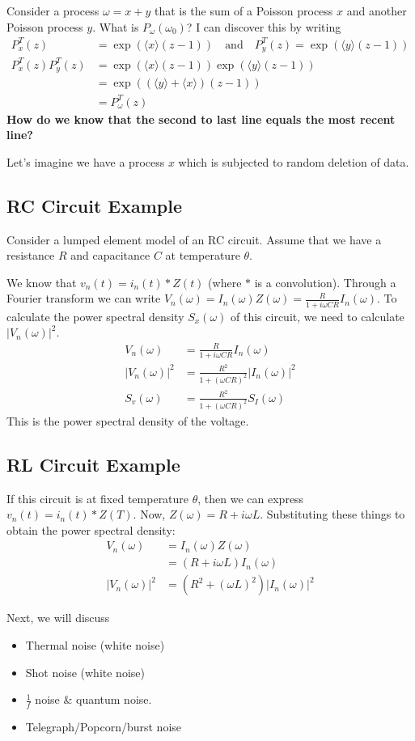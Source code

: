 \documentclass{article}
\begin{document}
Consider a process $ \omega = x + y $ that is the sum of a Poisson process $ x $ and
another Poisson process $ y $. What is $ P_{\omega}(\omega_{0}) $? I can
discover this by writing
\begin{align*}
   P_{x}^{T}(z) &= \exp(\langle x \rangle \left( z-1 \right))
   \quad\text{and}\quad
   P_{y}^{T}(z) = \exp(\langle y \rangle \left( z-1 \right))
    \\
   P_{x}^{T}(z) P_{y}^{T}(z) &= \exp(\langle x \rangle \left( z-1
   \right))\exp(\langle y \rangle \left( z-1 \right)) \\
   &= \exp((\langle y \rangle + \langle x \rangle) \left( z-1 \right)) \\
   &= P_{\omega}^{T}(z)
\end{align*}
\textbf{How do we know that the second to last line equals the most recent
line?}

Let's imagine we have a process $ x $ which is subjected to random deletion of
data.

\subsection{RC Circuit Example}
\label{sub:rc_circuit_example}

Consider a lumped element model of an RC circuit. Assume that we have a
resistance $ R $ and capacitance $ C $ at temperature $ \theta $.

We know that $ v_{n}(t) = i_{n}(t) * Z(t)$ (where $ * $ is a convolution).
Through a Fourier transform we can write $ V_{n}(\omega) =
I_{n}(\omega)Z(\omega) = \frac{R}{1 + i \omega C R }I_{n}(\omega) $. To
calculate the power spectral density $ S_{x}(\omega) $ of this circuit, we need
to calculate $ \left| V_{n}(\omega) \right|^2 $.
\begin{align*}
   V_{n}(\omega) &= \frac{R}{1+ i\omega C R}I_{n}(\omega) \\
   |V_{n}(\omega)|^2 &= \frac{R^{2}}{1 + \left( \omega C R \right)^2}
   |I_{n}(\omega)|^2 \\
   S_{v}(\omega) &= \frac{R^2}{1 + \left( \omega C R \right)^2} S_{I}(\omega)
\end{align*}
This is the power spectral density of the voltage.

\subsection{RL Circuit Example}
\label{sub:rl_circuit_example}

If this circuit is at fixed temperature $ \theta $, then we can express $
v_{n}(t) = i_{n}(t) * Z(T) $. Now, $ Z(\omega) = R + i \omega L $. Substituting
these things to obtain the power spectral density:
\begin{align*}
   V_{n}(\omega) &= I_{n}(\omega) Z(\omega) \\
   &= \left( R + i \omega L \right)I_{n}(\omega) \\
   \left| V_{n}(\omega) \right|^2 &= \left( R^2 + \left( \omega L \right)^2
   \right) |I_{n}(\omega)|^2
\end{align*}

Next, we will discuss
\begin{itemize}
   \item Thermal noise (white noise)
   \item Shot noise (white noise)
   \item $ \frac{1}{f} $ noise \& quantum noise.
   \item Telegraph/Popcorn/burst noise
\end{itemize}
\end{document}
